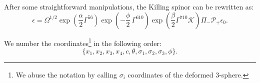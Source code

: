 After some straightforward manipulations, the Killing spinor can be rewritten as:
\begin{equation}\label{eq:KillingSpinor}
\boxed{ \epsilon =  \Omega^{1/2} \exp{\left(\frac{\alpha}{2}\Gamma^{56} \right)} \exp{\left(-\frac{\phi}{2}\, \Gamma^{6 10} \right)} \exp{\left(\frac{\beta}{2}\Gamma^{7 10} \mathcal{K} \right)} \Pi_{-} \mathcal{P}_+ \epsilon_0}.
\end{equation}

We number the coordinates\footnote{We abuse the notation by calling $\sigma_i$ coordinates of the deformed 3-sphere.} in the following order:
\begin{equation}
 \{x_1, x_2, x_3, x_4, c, \theta, \sigma_1, \sigma_2, \sigma_3, \phi\}. 
\end{equation}


